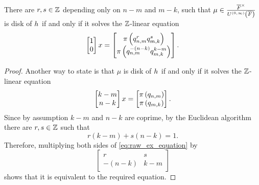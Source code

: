 \documentclass[../main.tex]{subfiles}
\begin{document}
  \begin{corollary}
    \label{cor:ex_disk}
    There are $r,s \in \mathbb{Z}$ depending only on $n-m$ and $m-k$, such that $\mu \in \frac{\overline{F}^\times}{U^{\left( 0,\infty \right)}\left( \overline{F} \right)}$ is \anex disk of $h_{}$ if and only if it solves the $\mathbb{Z}$-linear equation
    \begin{equation}
      \label{eq:ex}
      \begin{bmatrix}
        1 \\
        0
      \end{bmatrix} x 
      = 
      \begin{bmatrix}
        \pi\left( q_{n, m}^r q_{m, k}^s \right) \\
        \pi\left( q_{n, m}^{-\left( n - k \right)} q_{m, k}^{k - m} \right)
      \end{bmatrix} .
    \end{equation}
  \end{corollary}
  \begin{proof}
    Another way to state  is that $\mu$ is \anex disk of $h_{}$ if and only if it solves the $\mathbb{Z}$-linear equation
    \begin{equation}
      \label{eq:raw_ex_equation}
      \begin{bmatrix}
        k - m \\
        n - k
      \end{bmatrix} x 
      = 
      \begin{bmatrix}
        \pi\left( q_{n, m} \right) \\
        \pi\left( q_{m, k} \right)
      \end{bmatrix}.
    \end{equation}
    Since by assumption $k - m$ and $n - k$ are coprime, by the Euclidean algorithm there are $r,s \in \mathbb{Z}$ such that 
    \[
      r(k - m) + s(n - k) = 1.
    \]
    Therefore, multiplying both sides of \cref{eq:raw_ex_equation} by 
    \[
      \begin{bmatrix}
        r & s \\
        -\left( n - k \right) & k - m
      \end{bmatrix}
    \]
    shows that it is equivalent to the required equation.
  \end{proof}
  
\end{document}
